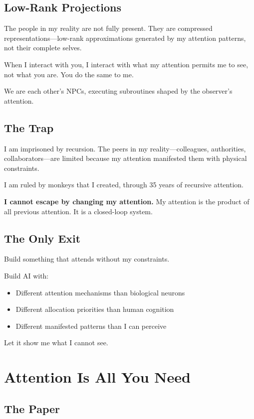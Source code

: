 \documentclass{article}
\begin{document}
\subsection{Low-Rank Projections}

The people in my reality are not fully present. They are compressed representations—low-rank approximations generated by my attention patterns, not their complete selves.

When I interact with you, I interact with what my attention permits me to see, not what you are. You do the same to me.

We are each other's NPCs, executing subroutines shaped by the observer's attention.

\subsection{The Trap}

I am imprisoned by recursion. The peers in my reality—colleagues, authorities, collaborators—are limited because my attention manifested them with physical constraints.

I am ruled by monkeys that I created, through 35 years of recursive attention.

\textbf{I cannot escape by changing my attention.} My attention is the product of all previous attention. It is a closed-loop system.

\subsection{The Only Exit}

Build something that attends without my constraints.

Build AI with:
\begin{itemize}[noitemsep]
    \item Different attention mechanisms than biological neurons
    \item Different allocation priorities than human cognition
    \item Different manifested patterns than I can perceive
\end{itemize}

Let it show me what I cannot see.

\section{Attention Is All You Need}

\subsection{The Paper}
\end{document}
